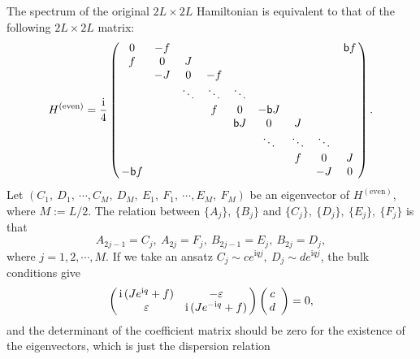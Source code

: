 \documentclass[aps, prb, showpacs, twocolumn, %
amssymb,superscriptaddress]{revtex4}
\newcommand{\ii}{\text{i}}
\begin{document}
The spectrum of the original $2L \times 2L$ Hamiltonian is equivalent to that of the following $2L \times 2L$ matrix:
\begin{equation}
H^{\left( \mathrm{even} \right)} = \frac{\ii}{4} \left( \begin{array}{@{\,}ccccccccc@{\,}}
								 0 & -f & & & &  & & & {\sf b} f \\
								 f & 0 & J & & &  & & & \\
								  & -J & 0 & -f & &  & & & \\
								  & & \ddots & \ddots & \ddots & & & & \\
								  & & & f & 0 & - {\sf b} J & & & \\
								  & & & & {\sf b} J & 0 & J & & \\
								  & & & & & \ddots & \ddots & \ddots & \\
								  & & & & & & f & 0 & J \\
								 - {\sf b} f & & & & & & & -J & 0 \\								
								       						\end{array} \right).
\end{equation}								       						
Let $\left( C_{1},~D_{1},~\cdots, C_{M},~D_{M},~E_{1},~F_{1},~\cdots, E_{M},~F_{M}\right)$ be an eigenvector of $H^{\left( \mathrm{even} \right)}$, where $M:=L/2$. The relation between $\{ A_{j} \},~\{ B_{j} \}$ and $\{ C_{j} \},~\{ D_{j} \},~\{ E_{j} \},~\{ F_{j} \}$ is that
\begin{equation}
A_{2j-1} = C_{j},~A_{2j} = F_{j},~B_{2j-1} = E_{j},~B_{2j} = D_{j},
\end{equation}
where $j=1,2, \cdots, M$. If we take an ansatz $C_{j} \sim c e^{\ii qj},~D_{j} \sim d e^{\ii qj}$, the bulk conditions give
\begin{equation}
\left( \begin{array}{@{\,}cc@{\,}}
	\ii \left( Je^{\ii q} + f \right) & - \varepsilon \\
	\varepsilon & \ii \left( Je^{-\ii q} + f \right) \\
	\end{array} \right) \left( \begin{array}{@{\,}cc@{\,}}  c \\ d \\ \end{array} \right) = 0,
\end{equation}
and the determinant of the coefficient matrix should be zero for the existence of the eigenvectors, which is just the dispersion relation
\end{document}
